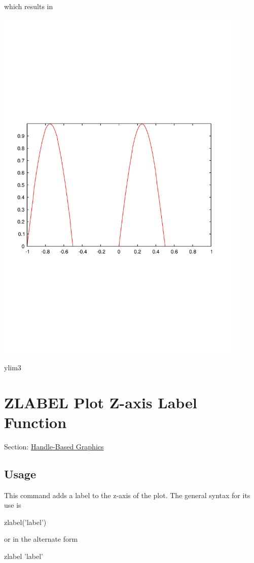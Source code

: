 which results in  
\begin{DoxyImage}
\includegraphics[width=12cm]{ylim3}
\caption{ylim3}
\end{DoxyImage}
 \hypertarget{handle_zlabel}{}\section{Z\-L\-A\-B\-E\-L Plot Z-\/axis Label Function}\label{handle_zlabel}
Section\-: \hyperlink{sec_handle}{Handle-\/\-Based Graphics} \hypertarget{vtkwidgets_vtkxyplotwidget_Usage}{}\subsection{Usage}\label{vtkwidgets_vtkxyplotwidget_Usage}
This command adds a label to the z-\/axis of the plot. The general syntax for its use is \begin{DoxyVerb}  zlabel('label')
\end{DoxyVerb}
 or in the alternate form \begin{DoxyVerb}  zlabel 'label'
\end{DoxyVerb}
